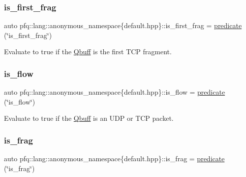 \subsubsection{\texorpdfstring{is\+\_\+first\+\_\+frag}{is\_first\_frag}}
{\footnotesize\ttfamily auto pfq\+::lang\+::anonymous\+\_\+namespace\{default.\+hpp\}\+::is\+\_\+first\+\_\+frag = \hyperlink{namespacepfq_1_1lang_aca9adafc436b7f851621b979fa1aaf88}{predicate} (\char`\"{}is\+\_\+first\+\_\+frag\char`\"{})}



Evaluate to {\ttfamily true} if the \hyperlink{structpfq_1_1lang_1_1Qbuff}{Qbuff} is the first T\+CP fragment. 

\mbox{\label{namespacepfq_1_1lang_1_1anonymous__namespace_02default_8hpp_03_ae52890434121a999589d48bccae3c3e2}} 
\subsubsection{\texorpdfstring{is\+\_\+flow}{is\_flow}}
{\footnotesize\ttfamily auto pfq\+::lang\+::anonymous\+\_\+namespace\{default.\+hpp\}\+::is\+\_\+flow = \hyperlink{namespacepfq_1_1lang_aca9adafc436b7f851621b979fa1aaf88}{predicate} (\char`\"{}is\+\_\+flow\char`\"{})}



Evaluate to {\ttfamily true} if the \hyperlink{structpfq_1_1lang_1_1Qbuff}{Qbuff} is an U\+DP or T\+CP packet. 

\mbox{\label{namespacepfq_1_1lang_1_1anonymous__namespace_02default_8hpp_03_af042e092c925ae6306ae85ae5a56563d}} 
\subsubsection{\texorpdfstring{is\+\_\+frag}{is\_frag}}
{\footnotesize\ttfamily auto pfq\+::lang\+::anonymous\+\_\+namespace\{default.\+hpp\}\+::is\+\_\+frag = \hyperlink{namespacepfq_1_1lang_aca9adafc436b7f851621b979fa1aaf88}{predicate} (\char`\"{}is\+\_\+frag\char`\"{})}



